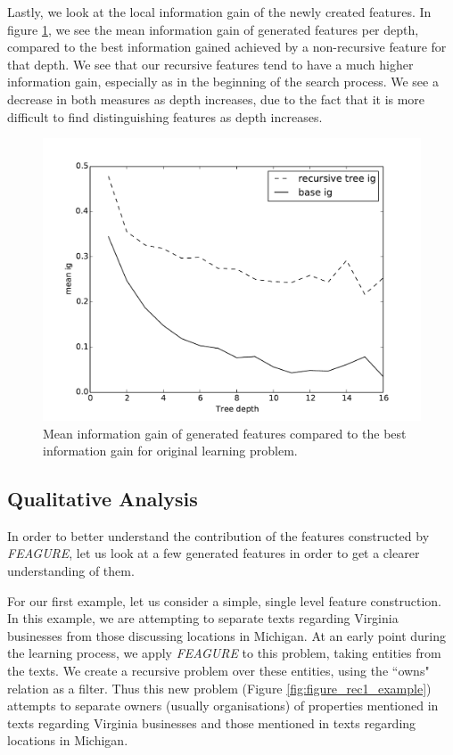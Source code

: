 \documentclass[twoside,11pt]{article}
\theoremstyle{definition}
\begin{document}
Lastly, we look at the local information gain of the newly created features. In figure \ref{fig:local_ig_depth}, we see the mean information gain of generated features per depth, compared to the best information gained achieved by a non-recursive feature for that depth. We see that our recursive features tend to have a much higher information gain, especially as in the beginning of the search process. We see a decrease in both measures as depth increases, due to the fact that it is more difficult to find distinguishing features as depth increases.

\begin{figure}[h!]
	\centering
	\includegraphics[scale=0.4]{local_ig_depth}
	\caption{Mean information gain of generated features compared to the best information gain for original learning problem.}
	\label{fig:local_ig_depth}
\end{figure}

\subsection{Qualitative Analysis}

In order to better understand the contribution of the features constructed by \emph{FEAGURE}, let us look at a few generated features in order to get a clearer understanding of them.

For our first example, let us consider a simple, single level feature construction.
In this example, we are attempting to separate texts regarding Virginia businesses from those discussing locations in Michigan. At an early point during the learning process, we apply \emph{FEAGURE} to this problem, taking entities from the texts. We create a recursive problem over these entities, using the ``owns" relation as a filter. Thus this new problem (Figure \ref{fig:figure_rec1_example}) attempts to separate owners (usually organisations) of properties mentioned in texts regarding Virginia businesses and those mentioned in texts regarding locations in Michigan.
\end{document}
